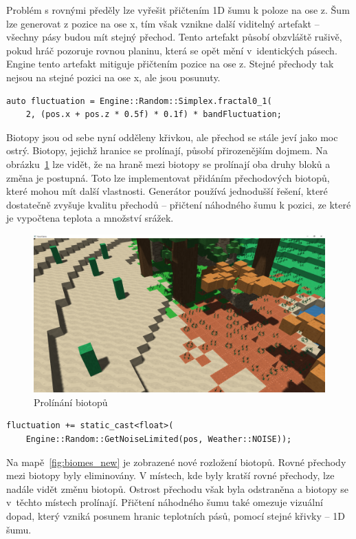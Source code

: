 \documentclass[thesis=M,czech]{FITthesis}[2019/12/23]
\begin{document}
Problém s rovnými předěly lze vyřešit přičtením 1D šumu k poloze na ose z. Šum lze generovat z pozice na ose x, tím však vznikne další viditelný artefakt – všechny pásy budou mít stejný přechod. Tento artefakt působí obzvláště rušivě, pokud hráč pozoruje rovnou planinu, která se opět mění v~identických pásech. Engine tento artefakt mitiguje přičtením pozice na ose z. Stejné přechody tak nejsou na stejné pozici na ose x, ale jsou posunuty.

\begin{verbatim}
auto fluctuation = Engine::Random::Simplex.fractal0_1(
    2, (pos.x + pos.z * 0.5f) * 0.1f) * bandFluctuation;
\end{verbatim}

Biotopy jsou od sebe nyní odděleny křivkou, ale přechod se stále jeví jako moc ostrý. Biotopy, jejichž hranice se prolínají, působí přirozenějším dojmem. Na obrázku~\ref{fig:fuzzy_trans} lze vidět, že na hraně mezi biotopy se prolínají oba druhy bloků a změna je postupná. Toto lze implementovat přidáním přechodových biotopů, které mohou mít další vlastnosti. Generátor používá jednodušší řešení, které dostatečně zvyšuje kvalitu přechodů – přičtení náhodného šumu k pozici, ze které je vypočtena teplota a množství srážek.

\begin{figure}\centering
	\includegraphics[width=\textwidth]{images/world_gen/fuzzy_trans}
	\caption[Prolínání biotopů]{Prolínání biotopů}\label{fig:fuzzy_trans}
\end{figure}

\begin{verbatim}
fluctuation += static_cast<float>(
    Engine::Random::GetNoiseLimited(pos, Weather::NOISE));
\end{verbatim}

Na mapě~\ref{fig:biomes_new} je zobrazené nové rozložení biotopů. Rovné přechody mezi biotopy byly eliminovány. V místech, kde byly kratší rovné přechody, lze nadále vidět změnu biotopů. Ostrost přechodu však byla odstraněna a biotopy se v~těchto místech prolínají. Přičtení náhodného šumu také omezuje vizuální dopad, který vzniká posunem hranic teplotních pásů, pomocí stejné křivky -- 1D šumu.
\end{document}

